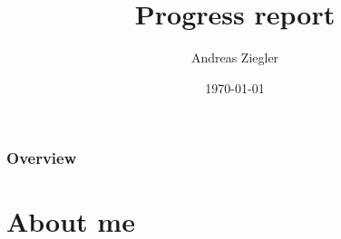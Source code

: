 \documentclass[xcolor={x11names}]{beamer}
\title[Introduction]{Progress report} %
\author{Andreas Ziegler} %
\institute[V4RL] %
{
ETH Zurich \\ %
\medskip
\textit{anziegle@ethz.com} %
}
\date{\today} %
\begin{document}
\begin{frame}
\titlepage %
\end{frame}

\begin{frame}
\frametitle{Overview} %
\tableofcontents %
\end{frame}


\section{About me} %

\end{document}
